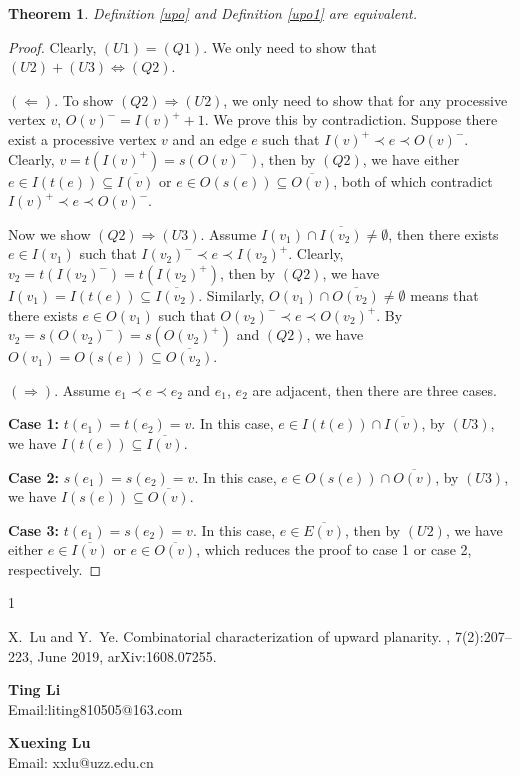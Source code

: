 \documentclass[11pt,a4paper]{article}
\newtheorem{thm}{Theorem}
\begin{document}
\begin{thm}\label{eq}
Definition \ref{upo} and Definition \ref{upo1} are equivalent.
\end{thm}
\begin{proof}
Clearly, $(U1)=(Q1)$. We only need to show that $(U2)+(U3)\Longleftrightarrow (Q2)$.

$(\Longleftarrow)$. To show $(Q2)\Longrightarrow(U2)$, we only need to show that for any processive vertex $v$, $O(v)^-=I(v)^++1$. We prove this by contradiction. Suppose there exist a processive vertex $v$ and an edge $e$ such that $I(v)^+\prec e \prec O(v)^-$. Clearly, $v=t(I(v)^+)=s(O(v)^-)$, then by $(Q2)$, we have either $e\in I(t(e))\subseteq \overline{I(v)}$ or $e\in O(s(e))\subseteq\overline{O(v)}$, both of which  contradict $I(v)^+\prec e \prec O(v)^-$.

Now we show $(Q2)\Longrightarrow(U3)$. Assume $I(v_1)\cap \overline{I(v_2)}\neq \emptyset$, then there exists $e\in I(v_1)$ such that $I(v_2)^-\prec e \prec I(v_2)^+$. Clearly, $v_2=t(I(v_2)^-)=t(I(v_2)^+)$, then by $(Q2)$, we have $I(v_1)=I(t(e))\subseteq \overline{I(v_2)}$. Similarly, $O(v_1)\cap \overline{O(v_2)}\neq \emptyset$ means that there exists $e\in O(v_1)$ such that $O(v_2)^-\prec e \prec O(v_2)^+$. By $v_2=s(O(v_2)^-)=s(O(v_2)^+)$ and $(Q2)$, we have $O(v_1)=O(s(e))\subseteq \overline{O(v_2)}$.

$(\Longrightarrow)$. Assume $e_1\prec e\prec e_2$ and $e_1$, $e_2$ are adjacent, then there are three cases.

\noindent\textbf{Case 1:} $t(e_1)=t(e_2)=v$. In this case, $e\in I(t(e))\cap\overline{I(v)}$, by $(U3)$, we have $I(t(e))\subseteq\overline{I(v)}$.

\noindent\textbf{Case 2:} $s(e_1)=s(e_2)=v$. In this case, $e\in O(s(e))\cap\overline{O(v)}$, by $(U3)$, we have $I(s(e))\subseteq\overline{O(v)}$.

\noindent\textbf{Case 3:} $t(e_1)=s(e_2)=v$. In this case, $e\in \overline{E(v)}$, then by $(U2)$, we have either $e\in \overline{I(v)}$ or $e\in \overline{O(v)}$, which reduces the proof to case 1 or case 2, respectively.
\end{proof}








\begin{thebibliography}{1}


\bibitem{[LY16]}
X.~Lu and Y.~Ye.
\newblock Combinatorial characterization of upward planarity.
, 7(2):207--223, June 2019, arXiv:1608.07255.

\end{thebibliography}



\textbf{Ting  Li}\hfill \\  Email:liting810505@163.com


\textbf{Xuexing Lu}\hfill \\  Email: xxlu@uzz.edu.cn
\end{document}
